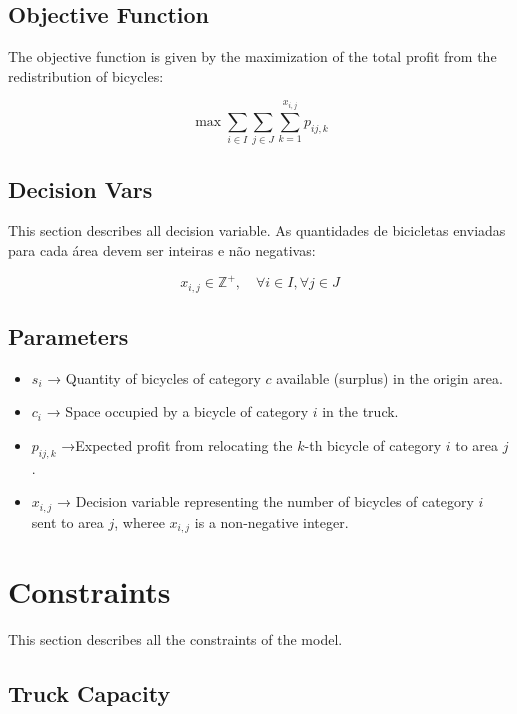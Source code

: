 \documentclass[]{article}
\begin{document}
\subsection{Objective Function}

The objective function is given by the maximization of the total profit from the redistribution of bicycles:

\begin{equation}
\max \sum_{i \in I} \sum_{j \in J} \sum_{k=1}^{x_{i,j}} p_{ij,k}
\end{equation}

\subsection{Decision Vars}
This section describes all decision variable. As quantidades de bicicletas enviadas para cada área devem ser inteiras e não negativas:

\begin{equation}
	x_{i,j} \in \mathbb{Z}^+, \quad \forall i \in I, \forall j \in J
\end{equation}

\subsection{Parameters}

\begin{itemize}
	\item $s_i$ → Quantity of bicycles of category 
	$c$ available (surplus) in the origin area.
	\item $c_i$ → Space occupied by a bicycle of category $i$ in the truck.
	\item $p_{ij,k}$ →Expected profit from relocating the 
	$k$-th bicycle of category $i$ to area $j$.
	\item $x_{i,j}$ → Decision variable representing the number of bicycles of category $i$ sent to area $j$, wheree $x_{i,j}$ is a non-negative integer.
\end{itemize}

\section{Constraints}

This section describes all the constraints of the model.

\subsection{Truck Capacity}
\end{document}
